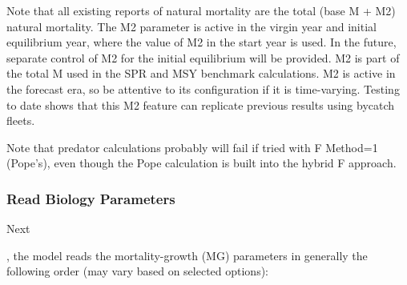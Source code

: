 Note that all existing reports of natural mortality are the total (base M + M2) natural mortality. The M2 parameter is active in the virgin year and initial equilibrium year, where the value of M2 in the start year is used. In the future, separate control of M2 for the initial equilibrium will be provided. M2 is part of the total M used in the SPR and MSY benchmark calculations. M2 is active in the forecast era, so be attentive to its configuration if it is time-varying. Testing to date shows that this M2 feature can replicate previous results using bycatch fleets.

Note that predator calculations probably will fail if tried with F Method=1 (Pope's), even though the Pope calculation is built into the hybrid F approach.

\subsubsection{Read Biology Parameters}
\hypertarget{MGorder}{Next}, the model reads the mortality-growth (MG) parameters in generally the following order (may vary based on selected options):

